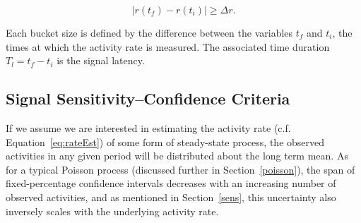\documentclass{article}
\begin{document}


\begin{equation}
    \label{eq:signal}
    | r(t_f) - r(t_i) | \geq \Delta r.
\end{equation}

Each bucket size is defined by the difference between the variables $t_f$ and $t_i$, the times at which 
the activity rate is measured. The associated time duration $T_l = t_f - t_i$ is the signal latency.  


\subsection{Signal Sensitivity--Confidence Criteria} 
\label{conf}


If  
\reversemarginpar\marginpar{\raggedleft
%
    \begin{tikzpicture}[scale=0.26]]
\draw [red, very thick, rotate around={-60: (3.0, 0)}] (-0.7, -0.7) rectangle(3.7, 0.7);
%
\draw [very thick, <->] (0.25000000000000006, 0.4330127018922193) -- (1.25, 2.165063509461097) ;
\draw [very thick, <->] (1.75, 2.165063509461097) -- (2.75, 0.4330127018922193) ;
\draw [very thick, <->] (2.5, 0) -- (0.5, 0) ;
%
\draw [orange, ultra thick] (0,0) circle [radius= 0.5 ];
\draw [yellow, ultra thick] ( 1.5 , 2.59807621135 ) circle [radius= 0.5 ];
\draw [green,  ultra thick] ( 3.0 , 0 ) circle [radius= 0.5 ];
    \end{tikzpicture}
%
%
} 
we assume we are interested in estimating the activity rate (c.f. Equation~\ref{eq:rateEst}) of 
some form of steady-state process, the observed activities in any given period will be distributed 
about the long term mean. As for a typical Poisson process (discussed further in 
Section~\ref{poisson}), the span of fixed-percentage confidence intervals decreases with an 
increasing number of observed activities, and as mentioned in Section~\ref{sens}, this uncertainty 
also inversely scales with the underlying activity rate.
\end{document}
